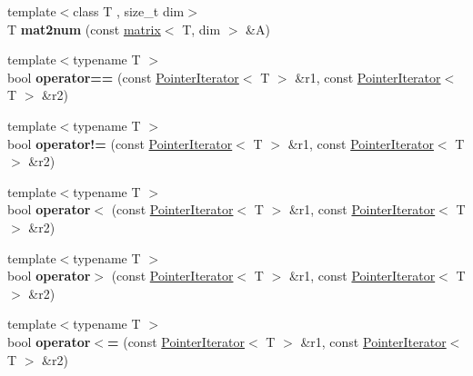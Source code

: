 \begin{DoxyCompactItemize}
\item 
\hypertarget{namespacekeycpp_ae75fa09ce73880f22e79334a51e74adf}{{\footnotesize template$<$class T , size\-\_\-t dim$>$ }\\T {\bfseries mat2num} (const \hyperlink{classkeycpp_1_1matrix}{matrix}$<$ T, dim $>$ \&A)}\label{namespacekeycpp_ae75fa09ce73880f22e79334a51e74adf}

\item 
\hypertarget{namespacekeycpp_adfb32fd99bb09455f5a124df4560ab0f}{{\footnotesize template$<$typename T $>$ }\\bool {\bfseries operator==} (const \hyperlink{classkeycpp_1_1_pointer_iterator}{Pointer\-Iterator}$<$ T $>$ \&r1, const \hyperlink{classkeycpp_1_1_pointer_iterator}{Pointer\-Iterator}$<$ T $>$ \&r2)}\label{namespacekeycpp_adfb32fd99bb09455f5a124df4560ab0f}

\item 
\hypertarget{namespacekeycpp_a9358d5f3f08dd8ed262697b7e8b2a4f1}{{\footnotesize template$<$typename T $>$ }\\bool {\bfseries operator!=} (const \hyperlink{classkeycpp_1_1_pointer_iterator}{Pointer\-Iterator}$<$ T $>$ \&r1, const \hyperlink{classkeycpp_1_1_pointer_iterator}{Pointer\-Iterator}$<$ T $>$ \&r2)}\label{namespacekeycpp_a9358d5f3f08dd8ed262697b7e8b2a4f1}

\item 
\hypertarget{namespacekeycpp_a689a724b505d52660e42e1148eba1a9a}{{\footnotesize template$<$typename T $>$ }\\bool {\bfseries operator$<$} (const \hyperlink{classkeycpp_1_1_pointer_iterator}{Pointer\-Iterator}$<$ T $>$ \&r1, const \hyperlink{classkeycpp_1_1_pointer_iterator}{Pointer\-Iterator}$<$ T $>$ \&r2)}\label{namespacekeycpp_a689a724b505d52660e42e1148eba1a9a}

\item 
\hypertarget{namespacekeycpp_a7330eaaa701d2308c19f84adda097685}{{\footnotesize template$<$typename T $>$ }\\bool {\bfseries operator$>$} (const \hyperlink{classkeycpp_1_1_pointer_iterator}{Pointer\-Iterator}$<$ T $>$ \&r1, const \hyperlink{classkeycpp_1_1_pointer_iterator}{Pointer\-Iterator}$<$ T $>$ \&r2)}\label{namespacekeycpp_a7330eaaa701d2308c19f84adda097685}

\item 
\hypertarget{namespacekeycpp_a9b02f40e92cad47b419ac09207518b9f}{{\footnotesize template$<$typename T $>$ }\\bool {\bfseries operator$<$=} (const \hyperlink{classkeycpp_1_1_pointer_iterator}{Pointer\-Iterator}$<$ T $>$ \&r1, const \hyperlink{classkeycpp_1_1_pointer_iterator}{Pointer\-Iterator}$<$ T $>$ \&r2)}\label{namespacekeycpp_a9b02f40e92cad47b419ac09207518b9f}


\end{DoxyCompactItemize}
